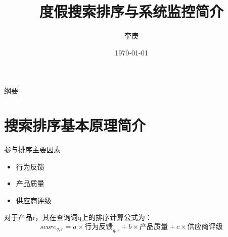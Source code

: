 \documentclass{beamer}
\begin{document}
\begin{CJK}{UTF8}{gbsn}

\title{度假搜索排序与系统监控简介}


\author{李庚}


\date{\today}




\begin{frame}
  \titlepage
\end{frame}

\begin{frame}{纲要}
  \tableofcontents
\end{frame}

\section{搜索排序基本原理简介}

\begin{frame}{参与排序主要因素}
  \begin{itemize}
    \item {行为反馈}
    \item {产品质量}
    \item {供应商评级}
  \end{itemize}
  \begin{block}{对于产品r，其在查询词q上的排序计算公式为：}
    $$ score_{q,r} = a \times \text{行为反馈}_{q,r} + b \times \text{产品质量} + c \times \text{供应商评级} $$
  \end{block}
\end{frame}


\end{CJK}
\end{document}
